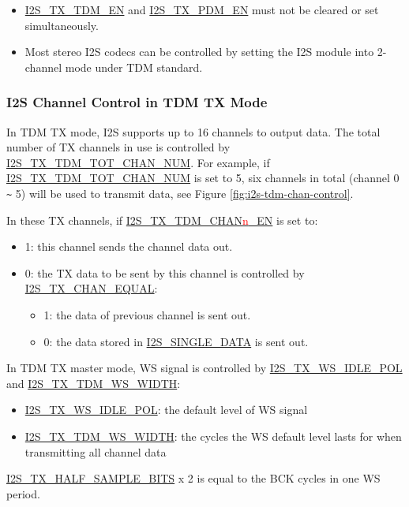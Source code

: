 \documentclass[main\_\_EN.tex]{subfiles}
\begin{document}
\begin{tiplisting}
\vspace{-2em}
\begin{itemize}
    \item \hyperref[fielddesc:I2STXTDMEN]{I2S\_TX\_TDM\_EN} and \hyperref[fielddesc:I2STXPDMEN]{I2S\_TX\_PDM\_EN} must not be cleared or set simultaneously. 
    \item Most stereo I2S codecs can be controlled by setting the I2S module into 2-channel mode under TDM standard.
    \end{itemize}
\end{tiplisting}

\subsubsection{I2S Channel Control in TDM TX Mode}\label{sec:i2s-chan-control-tdm-mode} 
In TDM TX mode, I2S supports up to 16 channels to output data. The total number of TX channels in use is controlled by \hyperref[fielddesc:I2STXTDMTOTCHANNUM]{I2S\_TX\_TDM\_TOT\_CHAN\_NUM}. For example, if  \hyperref[fielddesc:I2STXTDMTOTCHANNUM]{I2S\_TX\_TDM\_TOT\_CHAN\_NUM} is set to 5, six channels in total (channel 0 \verb+~+ 5) will be used to transmit data, see Figure \ref{fig:i2s-tdm-chan-control}.

In these TX channels, if \hyperref[fielddesc:I2STXTDMCHAN0EN]{I2S\_TX\_TDM\_CHAN{\textcolor{red}{n}}\_EN} is set to:
\begin{itemize}
    \item 1: this channel sends the channel data out.
    \item 0: the TX data to be sent by this channel is controlled by \hyperref[fielddesc:I2Ssec:i2s-tx-dataEQUAL]{I2S\_TX\_CHAN\_EQUAL}:
    \begin{itemize}
        \item 1: the data of previous channel is sent out.
        \item 0: the data stored in \hyperref[fielddesc:I2SSINGLEDATA]{I2S\_SINGLE\_DATA} is sent out.
    \end{itemize}
\end{itemize}
In TDM TX master mode, WS signal is controlled by \hyperref[fielddesc:I2STXWSIDLEPOL]{I2S\_TX\_WS\_IDLE\_POL} and \hyperref[fielddesc:I2STXTDMWSWIDTH]{I2S\_TX\_TDM\_WS\_WIDTH}:
\begin{itemize}
    \item \hyperref[fielddesc:I2STXWSIDLEPOL]{I2S\_TX\_WS\_IDLE\_POL}: the default level of WS signal
    \item \hyperref[fielddesc:I2STXTDMWSWIDTH]{I2S\_TX\_TDM\_WS\_WIDTH}: the cycles the WS default level lasts for when transmitting all channel data
\end{itemize}
\hyperref[fielddesc:I2STXHALFSAMPLEBITS]{I2S\_TX\_HALF\_SAMPLE\_BITS} x 2 is equal to the BCK cycles in one WS period.
\end{document}
